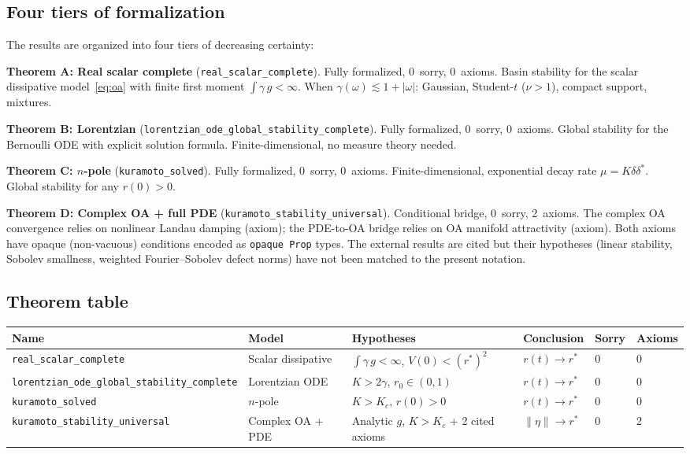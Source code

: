 \documentclass[11pt,a4paper]{article}
\theoremstyle{definition}
\begin{document}
\subsection{Four tiers of formalization}

The results are organized into four tiers of decreasing certainty:

\medskip
\noindent\textbf{Theorem A: Real scalar complete} (\texttt{real\_scalar\_complete}). Fully formalized, 0~sorry, 0~axioms. Basin stability for the scalar dissipative model~\eqref{eq:oa} with finite first moment $\int \gamma\,g < \infty$. When $\gamma(\omega) \lesssim 1 + |\omega|$: Gaussian, Student-$t$ ($\nu > 1$), compact support, mixtures.

\medskip
\noindent\textbf{Theorem B: Lorentzian} (\texttt{lorentzian\_ode\_global\_stability\_complete}). Fully formalized, 0~sorry, 0~axioms. Global stability for the Bernoulli ODE with explicit solution formula. Finite-dimensional, no measure theory needed.

\medskip
\noindent\textbf{Theorem C: $n$-pole} (\texttt{kuramoto\_solved}). Fully formalized, 0~sorry, 0~axioms. Finite-dimensional, exponential decay rate $\mu = K\delta\delta^*$. Global stability for any $r(0) > 0$.

\medskip
\noindent\textbf{Theorem D: Complex OA + full PDE} (\texttt{kuramoto\_stability\_universal}). Conditional bridge, 0~sorry, 2~axioms. The complex OA convergence relies on nonlinear Landau damping \cite{dietert2017} (axiom); the PDE-to-OA bridge relies on OA manifold attractivity \cite{dietert-fernandez2018} (axiom). Both axioms have opaque (non-vacuous) conditions encoded as \texttt{opaque Prop} types. The external results are cited but their hypotheses (linear stability, Sobolev smallness, weighted Fourier--Sobolev defect norms) have not been matched to the present notation.

\subsection{Theorem table}

\begin{center}
\small
\begin{tabular}{llllll}
\textbf{Name} & \textbf{Model} & \textbf{Hypotheses} & \textbf{Conclusion} & \textbf{Sorry} & \textbf{Axioms} \\
\hline
\texttt{real\_scalar\_complete} & Scalar dissipative & $\int\gamma\,g < \infty$, $V(0) < (r^*)^2$ & $r(t) \to r^*$ & 0 & 0 \\
\texttt{lorentzian\_ode\_global\_stability\_complete} & Lorentzian ODE & $K > 2\gamma$, $r_0 \in (0,1)$ & $r(t) \to r^*$ & 0 & 0 \\
\texttt{kuramoto\_solved} & $n$-pole & $K > K_c$, $r(0) > 0$ & $r(t) \to r^*$ & 0 & 0 \\
\texttt{kuramoto\_stability\_universal} & Complex OA + PDE & Analytic $g$, $K > K_c$ + 2 cited axioms & $\|\eta\| \to r^*$ & 0 & 2 \\
\end{tabular}
\end{center}
\end{document}
